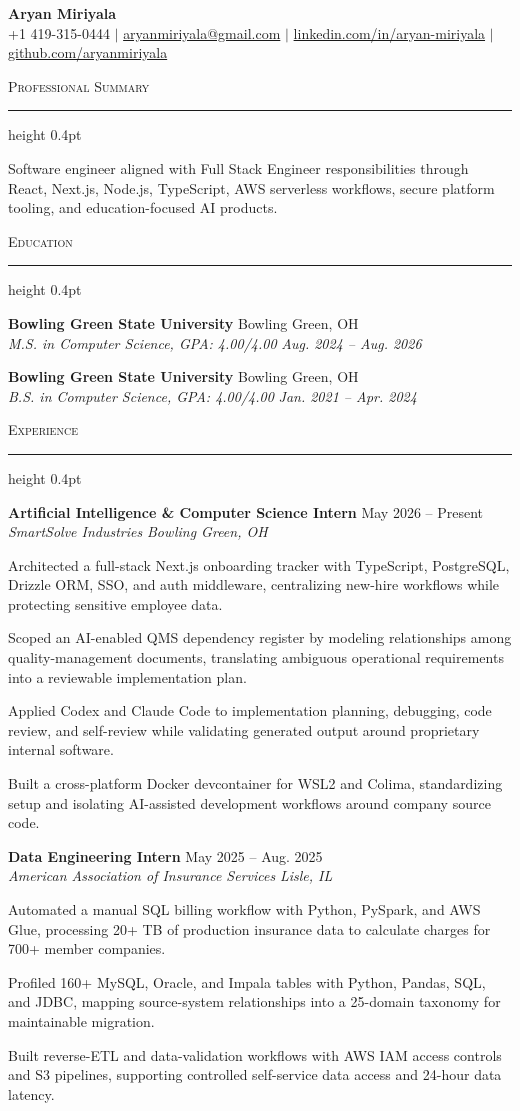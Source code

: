 \documentclass[letterpaper,11pt]{article}
\newcommand{\resumesection}[1]{%
  \par\vspace{2pt}%
  {\large\scshape #1}\par\vspace{2pt}%
  \hrule height 0.4pt\vspace{2pt}%
}
\newcommand{\resumeSubheading}[4]{
  \textbf{#1} \hfill #2\\
  \textit{#3} \hfill \textit{#4}
}
\begin{document}
\begin{center}
  {\LARGE \textbf{Aryan Miriyala}}\\[-1pt]
  \small
  +1 419-315-0444 $|$
  \href{mailto:aryanmiriyala@gmail.com}{aryanmiriyala@gmail.com} $|$
  \href{https://www.linkedin.com/in/aryan-miriyala-7788a21b6/}{linkedin.com/in/aryan-miriyala} $|$
  \href{https://github.com/aryanmiriyala}{github.com/aryanmiriyala}
\end{center}\vspace{-10pt}

\resumesection{Professional Summary}
Software engineer aligned with Full Stack Engineer responsibilities through React, Next.js, Node.js, TypeScript, AWS serverless workflows, secure platform tooling, and education-focused AI products.

\resumesection{Education}
\resumeSubheading
{Bowling Green State University}{Bowling Green, OH}
{M.S. in Computer Science, GPA: 4.00/4.00}{Aug. 2024 -- Aug. 2026}

\resumeSubheading
{Bowling Green State University}{Bowling Green, OH}
{B.S. in Computer Science, GPA: 4.00/4.00}{Jan. 2021 -- Apr. 2024}

\resumesection{Experience}
\resumeSubheading
{Artificial Intelligence \& Computer Science Intern}{May 2026 -- Present}
{SmartSolve Industries}{Bowling Green, OH}
\begin{tightitemize}
  \item Architected a full-stack Next.js onboarding tracker with TypeScript, PostgreSQL, Drizzle ORM, SSO, and auth middleware, centralizing new-hire workflows while protecting sensitive employee data.
  \item Scoped an AI-enabled QMS dependency register by modeling relationships among quality-management documents, translating ambiguous operational requirements into a reviewable implementation plan.
  \item Applied Codex and Claude Code to implementation planning, debugging, code review, and self-review while validating generated output around proprietary internal software.
  \item Built a cross-platform Docker devcontainer for WSL2 and Colima, standardizing setup and isolating AI-assisted development workflows around company source code.
\end{tightitemize}

\resumeSubheading
{Data Engineering Intern}{May 2025 -- Aug. 2025}
{American Association of Insurance Services}{Lisle, IL}
\begin{tightitemize}
  \item Automated a manual SQL billing workflow with Python, PySpark, and AWS Glue, processing 20+ TB of production insurance data to calculate charges for 700+ member companies.
  \item Profiled 160+ MySQL, Oracle, and Impala tables with Python, Pandas, SQL, and JDBC, mapping source-system relationships into a 25-domain taxonomy for maintainable migration.
  \item Built reverse-ETL and data-validation workflows with AWS IAM access controls and S3 pipelines, supporting controlled self-service data access and 24-hour data latency.
\end{tightitemize}
\end{document}
